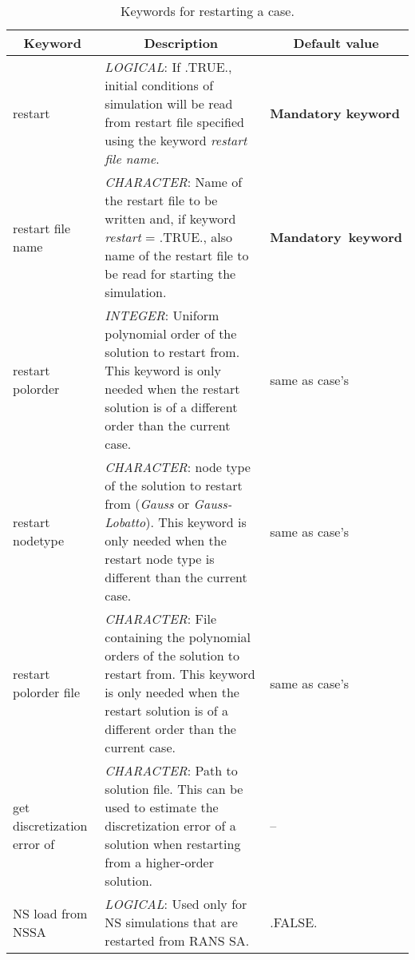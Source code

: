 \documentclass[a4paper,10pt]{report}
\begin{document}
\begin{table}[htbp]
\caption{Keywords for restarting a case.}
\begin{tabular}{|l|p{10cm}|p{2.2cm}|}
\hline
\multicolumn{1}{|c|}{Keyword} & \multicolumn{1}{c|}{Description} & \multicolumn{1}{c|}{Default value} \\ \hline

restart 			& \textit{LOGICAL}: If .TRUE., initial conditions of simulation will be read from restart file specified using the keyword \textit{restart file name}. & \textbf{Mandatory keyword} \\ \hline

restart file name   & \textit{CHARACTER}: Name of the restart file to be written and, if keyword \textit{restart} = .TRUE., also name of the restart file to be read for starting the simulation. & \textbf{Mandatory\ keyword} \\ \hline

restart polorder & \textit{INTEGER}: Uniform polynomial order of the solution to restart from. This keyword is only needed when the restart solution is of a different order than the current case. & same as case's \\ \hline

restart nodetype & \textit{CHARACTER}: node type of the solution to restart from (\emph{Gauss} or \emph{Gauss-Lobatto}). This keyword is only needed when the restart node type is different than the current case. & same as case's \\ \hline

restart polorder file &
			\textit{CHARACTER}: File containing the polynomial orders of the solution to restart from. This keyword is only needed when the restart solution is of a different order than the current case.  &  same as case's\\ \hline

get discretization error of & \textit{CHARACTER}: Path to solution file. This can be used to estimate the discretization error of a solution when restarting from a higher-order solution. & -- \\ \hline

NS load from NSSA &
            \textit{LOGICAL}: Used only for NS simulations that are restarted from RANS SA. & .FALSE. \\ \hline

\end{tabular}
\label{tab:restartkey}
\end{table}

\end{document}
